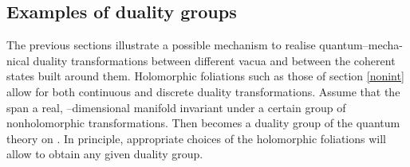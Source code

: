\documentclass[a4paper,a4paper]{article}
\begin{document}
\subsection{Examples of duality groups}\label{otros}

The previous sections illustrate a possible mechanism to realise quantum--mecha-nical 
duality transformations between different vacua and between the coherent states built 
around them. Holomorphic foliations \coordHE{} such as those of section \ref{nonint} 
allow for both continuous and discrete duality transformations. Assume that the \coordHE{} span 
a real, \coordHE{}--dimensional manifold invariant under a certain group \coordHE{} 
of nonholomorphic transformations. Then \coordHE{} becomes a duality group 
of the quantum theory on \coordHE{}. In principle, appropriate choices of the 
holomorphic foliations \coordHE{} will allow to obtain any given duality group. 
\end{document}
